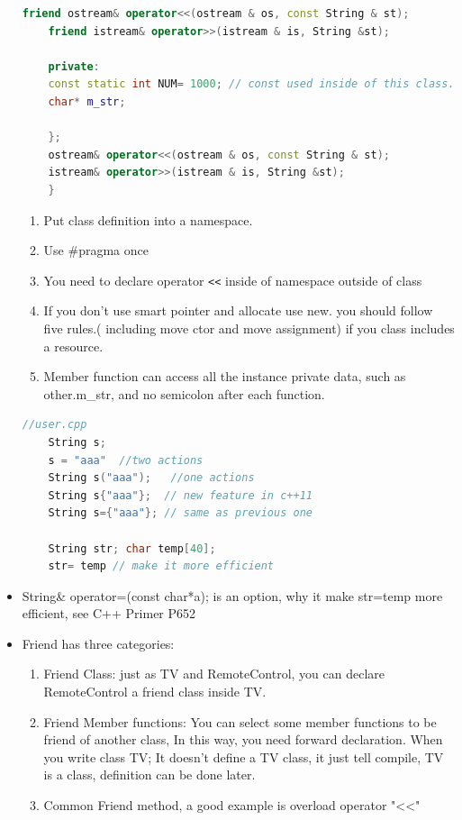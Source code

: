 \documentclass[a4paper,12pt,twoside]{book}
\begin{document}
\begin{itemize}
\begin{lstlisting}[frame=single, language=c++]
	friend ostream& operator<<(ostream & os, const String & st);
	friend istream& operator>>(istream & is, String &st);
	
	private:
	const static int NUM= 1000; // const used inside of this class.
	char* m_str;
	
	};
	ostream& operator<<(ostream & os, const String & st);
	istream& operator>>(istream & is, String &st);
	}
	\end{lstlisting}
	
	\begin{enumerate}
		\item Put class definition into a namespace.
		\item Use \#pragma once
		\item You need to declare operator \verb=<<= inside of namespace outside of class
		\item If you don't use smart pointer and allocate use new. you should follow five rules.( including move ctor and move assignment) if you class includes a resource.
		\item Member function can access all the instance private data, such as other.m\_str, and no semicolon after each function.
	\end{enumerate}
	
	
	\begin{lstlisting}[frame=single, language=c++]
	//user.cpp
	String s;
	s = "aaa"  //two actions
	String s("aaa");   //one actions
	String s{"aaa"};  // new feature in c++11
	String s={"aaa"}; // same as previous one
	
	String str; char temp[40];
	str= temp // make it more efficient
	\end{lstlisting}
	
	\item String\& operator=(const char*a); is an option, why it make str=temp more efficient, see C++ Primer P652
	
	\item  Friend has three categories:
	\begin{enumerate}
		\item Friend Class: just as TV and RemoteControl, you can declare RemoteControl a friend class inside TV.
		\item Friend Member functions: You can select some member functions to be friend of another class, In this way, you need forward declaration.  When you write class TV;  It doesn't define a TV class, it just tell compile, TV is a class, definition can be done later.
		\item Common Friend method, a good example is overload operator "<<"
	\end{enumerate}
	

\end{itemize}
\end{document}
